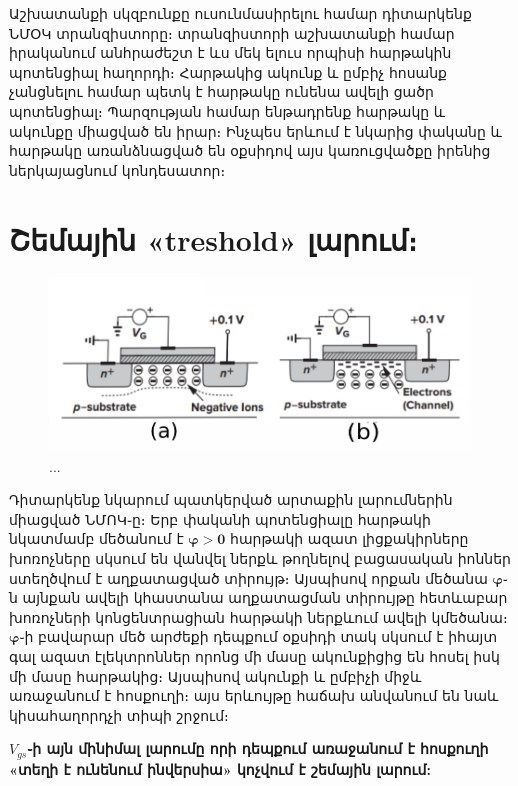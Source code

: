 \documentclass[
]{book}
\theoremstyle{definition}
\theoremstyle{definition}
\theoremstyle{definition}
\theoremstyle{definition}
\theoremstyle{remark}
\begin{document}
Աշխատանքի սկզբունքը ուսունմասիրելու համար դիտարկենք ՆՄՕԿ տրանզիստորը։ տրանզիստորի
աշխատանքի համար իրականում անհրաժեշտ է ևս մեկ ելուս որպիսի հարթակին պոտենցիալ հաղորդի։
Հարթակից ակունք և ըմբիչ հոսանք չանցնելու համար պետկ է հարթակը ունենա ավելի ցածր
պոտենցիալ։ Պարզության համար ենթադրենք հարթակը և ակունքը միացված են իրար։ Ինչպես երևում
է նկարից փականը և հարթակը առանձնացված են օքսիդով այս կառուցվածքը իրենից ներկայացնում
կոնդեսատոր։

\hypertarget{ux577ux565ux574ux561ux575ux56bux576-treshold-ux56cux561ux580ux578ux582ux574}{%
\section{Շեմային «treshold» լարում։}\label{ux577ux565ux574ux561ux575ux56bux576-treshold-ux56cux561ux580ux578ux582ux574}}

\begin{figure}

{\centering \includegraphics[width=1\linewidth]{imige/th} 

}

\caption{...}\label{fig:unnamed-chunk-2}
\end{figure}

Դիտարկենք նկարում պատկերված արտաքին լարումներին միացված ՆՄՈԿ֊ը։ Երբ փականի պոտենցիալը
հարթակի նկատմամբ մեծանում է \(\pmb{\varphi>0}\) հարթակի ազատ լիցքակիրները խոռոչները
սկսում են վանվել ներքև թողնելով բացասական իոններ ստեղծվում է աղքատացված տիրույթ։
Այսպիսով որքան մեծանա \(\pmb{\varphi}\)֊ն այնքան ավելի կհաստանա աղքատացման տիրույթը
հետևաբար խոռոչների կոնցենտրացիան հարթակի ներքևում ավելի կմեծանա։ \(\pmb{\varphi}\)֊ի
բավարար մեծ արժեքի դեպքում օքսիդի տակ սկսում է իհայտ գալ ազատ էլեկտրոններ որոնց մի մասը
ակունքիցից են հոսել իսկ մի մասը հարթակից։ Այսպիսով ակունքի և ըմբիչի միջև առաջանում է
հոսքուղի։ այս երևույթը հաճախ անվանում են նաև կիսահաղորդչի տիպի շրջում։

\textbf{\(V_{gs}\)֊ի այն մինիմալ լարումը որի դեպքում առաջանում է հոսքուղի «տեղի է ունենում
ինվերսիա» կոչվում է շեմային լարում:}
\end{document}
